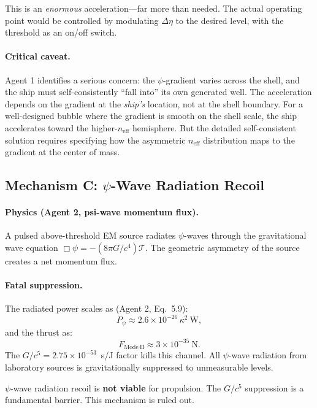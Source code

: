 \documentclass[12pt,aps,prd,superscriptaddress,nofootinbib,longbibliography]{revtex4-2}
\newcommand{\neff}{n_{\mathrm{eff}}}
\begin{document}
This is an \emph{enormous} acceleration---far more than needed.  The
actual operating point would be controlled by modulating $\Delta\eta$
to the desired level, with the threshold as an on/off switch.

\paragraph{Critical caveat.}
Agent 1 identifies a serious concern: the $\psi$-gradient varies across
the shell, and the ship must self-consistently ``fall into'' its own
generated well.  The acceleration depends on the gradient at the
\emph{ship's} location, not at the shell boundary.  For a well-designed
bubble where the gradient is smooth on the shell scale, the ship
accelerates toward the higher-$\neff$ hemisphere.  But the detailed
self-consistent solution requires specifying how the asymmetric $\neff$
distribution maps to the gradient at the center of mass.


\subsection{Mechanism C: $\psi$-Wave Radiation Recoil}

\paragraph{Physics (Agent 2, psi-wave momentum flux).}
A pulsed above-threshold EM source radiates $\psi$-waves through the
gravitational wave equation $\Box\psi = -(8\pi G/c^4)\mathcal{T}$.
The geometric asymmetry of the source creates a net momentum flux.

\paragraph{Fatal suppression.}
The radiated power scales as (Agent 2, Eq.~5.9):
\begin{equation}
P_\psi \approx 2.6 \times 10^{-26}\,\kappa^2~\mathrm{W},
\end{equation}
and the thrust as:
\begin{equation}
F_{\mathrm{Mode~II}} \approx 3 \times 10^{-35}~\mathrm{N}.
\end{equation}
The $G/c^5 = 2.75 \times 10^{-53}$~s/J factor kills this channel.
All $\psi$-wave radiation from laboratory sources is gravitationally
suppressed to unmeasurable levels.

\begin{tcolorbox}[colback=red!5!white, colframe=red!50!black,
  title=Mechanism C Verdict]
$\psi$-wave radiation recoil is \textbf{not viable} for propulsion.
The $G/c^5$ suppression is a fundamental barrier.  This mechanism is
ruled out.
\end{tcolorbox}
\end{document}

